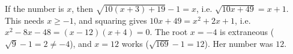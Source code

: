 If the number is $x$, then $\sqrt{10(x+3)+19}-1=x$, i.e. $\sqrt{10x+49}=x+1$. This needs $x\ge-1$, and squaring gives $10x+49=x^2+2x+1$, i.e. $x^2-8x-48=(x-12)(x+4)=0$. The root $x=-4$ is extraneous ($\sqrt9-1=2\ne-4$), and $x=12$ works ($\sqrt{169}-1=12$). Her number was $\boxed{12}$.
